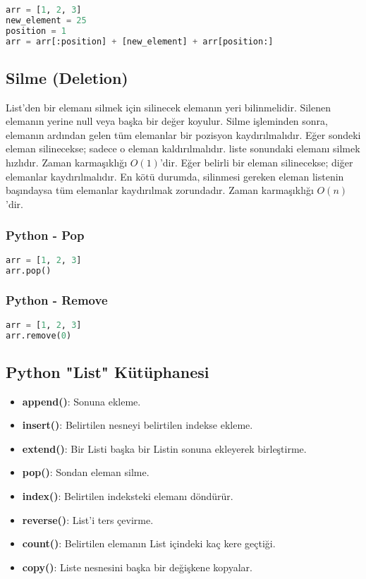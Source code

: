 \begin{lstlisting}[language=Python]
arr = [1, 2, 3]
new_element = 25
position = 1
arr = arr[:position] + [new_element] + arr[position:]
\end{lstlisting}

\subsection{Silme (Deletion)}

List'den bir elemanı silmek için silinecek elemanın yeri bilinmelidir. Silenen elemanın yerine null veya başka bir değer koyulur. Silme işleminden sonra, elemanın ardından gelen tüm elemanlar bir pozisyon kaydırılmalıdır. Eğer sondeki eleman silinecekse; sadece o eleman kaldırılmalıdır. liste sonundaki elemanı silmek hızlıdır. Zaman karmaşıklığı $O(1)$'dir. Eğer belirli bir eleman silinecekse; diğer elemanlar kaydırılmalıdır. En kötü durumda, silinmesi gereken eleman listenin başındaysa tüm elemanlar kaydırılmak zorundadır. Zaman karmaşıklığı $O(n)$'dir.

\subsubsection{Python - Pop}

\begin{lstlisting}[language=Python]
arr = [1, 2, 3]
arr.pop()
\end{lstlisting}

\subsubsection{Python - Remove}

\begin{lstlisting}[language=Python]
arr = [1, 2, 3]
arr.remove(0)
\end{lstlisting}

\subsection{Python "List" Kütüphanesi}

\begin{itemize}
    \item \textbf{append()}: Sonuna ekleme.
    \item \textbf{insert()}: Belirtilen nesneyi belirtilen indekse ekleme.
    \item \textbf{extend()}: Bir Listi başka bir Listin sonuna ekleyerek birleştirme.
    \item \textbf{pop()}: Sondan eleman silme.
    \item \textbf{index()}: Belirtilen indeksteki elemanı döndürür.
    \item \textbf{reverse()}: List'i ters çevirme.
    \item \textbf{count()}: Belirtilen elemanın List içindeki kaç kere geçtiği.
    \item \textbf{copy()}: Liste nesnesini başka bir değişkene kopyalar.
\end{itemize}

